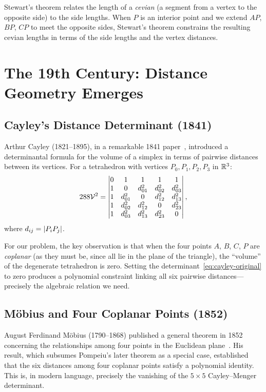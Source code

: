 Stewart's theorem relates the length of a \emph{cevian} (a segment from a vertex to the opposite side) to the side lengths. When $P$ is an interior point and we extend $AP$, $BP$, $CP$ to meet the opposite sides, Stewart's theorem constrains the resulting cevian lengths in terms of the side lengths and the vertex distances.

\section{The 19th Century: Distance Geometry Emerges}

\subsection{Cayley's Distance Determinant (1841)}
\label{sec:cayley-hist}

Arthur Cayley (1821--1895), in a remarkable 1841 paper~\citep{cayley1841}, introduced a determinantal formula for the volume of a simplex in terms of pairwise distances between its vertices. For a tetrahedron with vertices $P_0, P_1, P_2, P_3$ in $\mathbb{R}^3$:
\begin{equation}
\label{eq:cayley-original}
288 \mathcal{V}^2 = \begin{vmatrix}
0 & 1 & 1 & 1 & 1 \\
1 & 0 & d_{01}^2 & d_{02}^2 & d_{03}^2 \\
1 & d_{01}^2 & 0 & d_{12}^2 & d_{13}^2 \\
1 & d_{02}^2 & d_{12}^2 & 0 & d_{23}^2 \\
1 & d_{03}^2 & d_{13}^2 & d_{23}^2 & 0
\end{vmatrix},
\end{equation}
where $d_{ij} = \left\lvert P_i P_j \right\rvert$.

For our problem, the key observation is that when the four points $A$, $B$, $C$, $P$ are \emph{coplanar} (as they must be, since all lie in the plane of the triangle), the ``volume'' of the degenerate tetrahedron is zero. Setting the determinant~\eqref{eq:cayley-original} to zero produces a polynomial constraint linking all six pairwise distances---precisely the algebraic relation we need.

\subsection{M\"obius and Four Coplanar Points (1852)}

August Ferdinand M\"obius (1790--1868) published a general theorem in 1852 concerning the relationships among four points in the Euclidean plane~\citep{mobius1852}. His result, which subsumes Pompeiu's later theorem as a special case, established that the six distances among four coplanar points satisfy a polynomial identity. This is, in modern language, precisely the vanishing of the $5 \times 5$ Cayley--Menger determinant.

